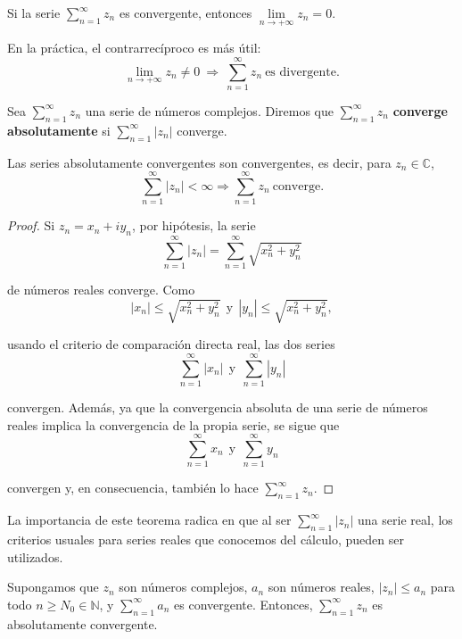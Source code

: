 \begin{propo}
Si la serie $\sum\limits_{n=1}^{\infty} z_n$ es convergente, entonces $\lim\limits_{n\to + \infty} z_n = 0.$
\end{propo}

En la práctica, el contrarrecíproco es más útil:
$$\lim_{n\to + \infty} z_n \neq 0 ~\Rightarrow~ \sum_{n=1}^{\infty} z_n ~ \mbox{es divergente}.$$

\begin{defi}
Sea $\sum\limits_{n=1}^{\infty } z_n$ una serie de números complejos. Diremos que  $\sum\limits_{n=1}^{\infty } z_n$ \textbf{converge absolutamente} si $\sum\limits_{n=1}^{\infty} |z_n|$ converge. 
\end{defi}

\begin{teorema} \label{CVAbsoluta}
Las series absolutamente convergentes son convergentes, es decir, para $z_n \in \mathbb{C}$,
$$\sum_{n=1}^{\infty} |z_n| < \infty \Rightarrow \sum_{n=1}^{\infty} z_n ~\mbox{converge}.$$
\end{teorema}

\begin{proof}
Si $z_n = x_n + iy_n$, por hipótesis, la serie
$$\sum_{n=1}^{\infty} |z_n| = \sum_{n=1}^{\infty} \sqrt{x_n^2 + y_n^2}$$

de números reales converge. Como
$$|x_n| \leq \sqrt{x_n^2 + y_n^2} ~~\mbox{y}~~ |y_n| \leq \sqrt{x_n^2 + y_n^2},$$

usando el criterio de comparación directa real, las dos series
$$\sum_{n=1}^{\infty} |x_n| ~~\mbox{y}~~ \sum_{n=1}^{\infty} |y_n|$$

convergen. Además, ya que la convergencia absoluta de una serie de números reales implica la convergencia de la propia serie, se sigue que 
$$\sum_{n=1}^{\infty} x_n  ~~\mbox{y}~~ \sum_{n=1}^{\infty} y_n$$

convergen y, en consecuencia, también lo hace $\sum\limits_{n=1}^{\infty} z_n$.
\end{proof}

La importancia de este teorema radica en que al ser $\sum\limits_{n=1}^{\infty} |z_n|$ una serie real, los criterios usuales para series reales que conocemos del cálculo, pueden ser utilizados. 

\begin{teorema}
Supongamos que $z_n$ son números complejos, $a_n$ son números reales, $|z_n| \leq  a_n$ para todo $n \geq N_0 \in \mathbb{N}$, y $\sum\limits_{n=1}^{\infty} a_n$ es convergente. Entonces, $\sum\limits_{n=1}^{\infty} z_n$ es absolutamente convergente.
\end{teorema}

